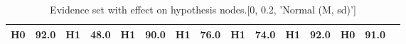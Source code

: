 \begin{table}
\begin{tabular}{c|cc|cc|cc|cc|cc|cc|cc}
\cellcolor{Bittersweet}H0&\cellcolor{Bittersweet}92.0&\cellcolor{Bittersweet}H1&\cellcolor{Bittersweet}48.0&\cellcolor{Bittersweet}H1&\cellcolor{Bittersweet}90.0&\cellcolor{Bittersweet}H1&\cellcolor{Bittersweet}76.0&\cellcolor{Bittersweet}H1&\cellcolor{Bittersweet}74.0&\cellcolor{Bittersweet}H1&\cellcolor{Bittersweet}92.0&\cellcolor{Bittersweet}H0&\cellcolor{Bittersweet}91.0\\\bottomrule\end{tabular}\caption{Evidence set with effect on hypothesis nodes.[0, 0.2, 'Normal (M, sd)']}\end{table}